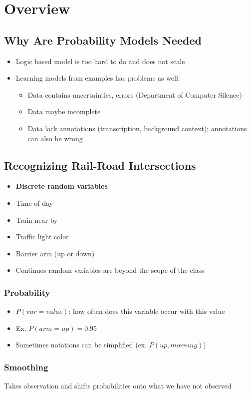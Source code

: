 \section{Overview}

  \subsection{Why Are Probability Models Needed}

    \begin{itemize}
      \item Logic based model is too hard to do and does not scale
      \item Learning models from examples has problems as well:
      \begin{itemize}
        \item Data contains uncertainties, errors (Department of Computer Silence)
        \item Data maybe incomplete
        \item Data lack annotations (transcription, background context);
        annotations can also be wrong
      \end{itemize}
    \end{itemize}

  \subsection{Recognizing Rail-Road Intersections}

    \begin{itemize}
      \item \textbf{Discrete random variables}
      \item Time of day
      \item Train near by
      \item Traffic light color
      \item Barrier arm (up or down)
      \item Continues random variables are beyond the scope of the class
    \end{itemize}

    \subsubsection{Probability}

      \begin{itemize}
        \item $ P(var = value) $: how often does this variable occur with this value
        \item Ex. $ P(arm = up) = 0.95 $
        \item Sometimes notations can be simplified (ex. $ P(up, morning) $)
      \end{itemize}

    \subsubsection{Smoothing}

      Takes observation and shifts probabilities onto what we have not observed
